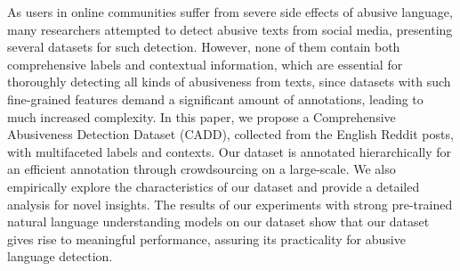 As users in online communities suffer from severe side effects of abusive language, many researchers attempted to detect abusive texts from social media, presenting several datasets for such detection. However, none of them contain both comprehensive labels and contextual information, which are essential for thoroughly detecting all kinds of abusiveness from texts, since datasets with such fine-grained features demand a significant amount of annotations, leading to much increased complexity. In this paper, we propose a Comprehensive Abusiveness Detection Dataset (CADD), collected from the English Reddit posts, with multifaceted labels and contexts. Our dataset is annotated hierarchically for an efficient annotation through crowdsourcing on a large-scale. We also empirically explore the characteristics of our dataset and provide a detailed analysis for novel insights. The results of our experiments with strong pre-trained natural language understanding models on our dataset show that our dataset gives rise to meaningful performance, assuring its practicality for abusive language detection.
